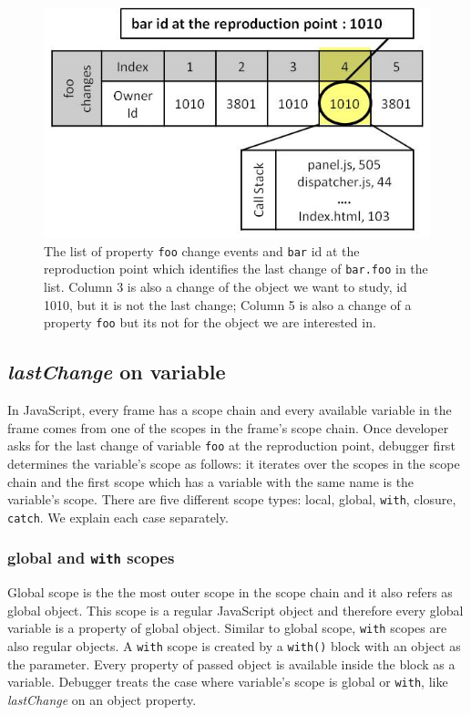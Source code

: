 \documentclass[preprint]{sigplanconf}
\begin{document}
\begin{figure}[htp]
\includegraphics[width=.48\textwidth]{6-foo-changes1.jpg}
\caption{The list of property \texttt{foo} change events and \texttt{bar} id at the reproduction point which identifies the last change of \texttt{bar.foo} in the list. Column 3 is also a change of the object we want to study, id 1010, but it is not the last change; Column 5 is also a change of a property \texttt{foo} but its not for the object we are interested in.}
\label{fig:foo-changes1}
\end{figure}

\subsection{\textit{lastChange} on variable} 
In JavaScript, every frame has a scope chain and every available variable in the frame comes from one of the scopes in the frame's scope chain. Once developer asks for the last change of variable \texttt{foo} at the reproduction point, debugger first determines the variable's scope as follows: it iterates over the scopes in the scope chain and the first scope which has a variable with the same name is the variable's scope. There are five different scope types: local, global, \texttt{with}, closure, \texttt{catch}. We explain each case separately.


\subsubsection{global and \texttt{with} scopes}
Global scope is the the most outer scope in the scope chain and it also refers as global object. This scope is a regular JavaScript object and therefore every global variable is a property of global object. Similar to global scope, \texttt{with} scopes are also regular objects. A \texttt{with} scope is created by a \texttt{with()} block with an object as the parameter. Every property of passed object is available inside the block as a variable. Debugger treats the case where variable's scope is global or \texttt{with}, like \textit{lastChange} on an object property. 
\end{document}
